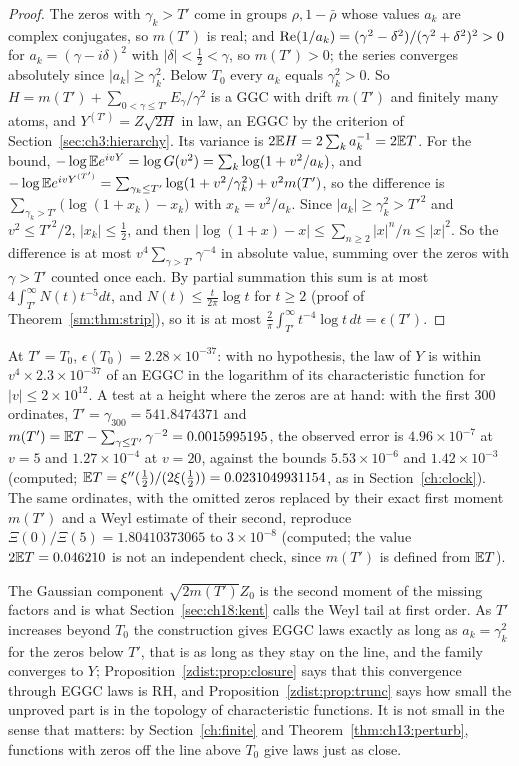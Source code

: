\begin{proof}
The zeros with $\gamma_k>T'$ come in groups $\rho,1-\bar\rho$ whose values $a_k$ are complex conjugates, so $m(T')$ is real; and $\operatorname{Re}(1/a_k)=(\gamma^2-\delta^2)/(\gamma^2+\delta^2)^2>0$ for $a_k=(\gamma-i\delta)^2$ with $|\delta|<\frac12<\gamma$, so $m(T')>0$; the series converges absolutely since $|a_k|\ge\gamma_k^2$. Below $T_0$ every $a_k$ equals $\gamma_k^2>0$. So $H=m(T')+\sum_{0<\gamma\le T'}E_\gamma/\gamma^2$ is a GGC with drift $m(T')$ and finitely many atoms, and $Y^{(T')}=Z\sqrt{2H}$ in law, an EGGC by the criterion of Section~\ref{sec:ch3:hierarchy}. Its variance is $2\mathbb{E} H=2\sum_ka_k^{-1}=2\mathbb{E} T$. For the bound, $-\log\mathbb{E} e^{ivY}=\log G(v^2)=\sum_k\log(1+v^2/a_k)$, and $-\log\mathbb{E} e^{ivY^{(T')}}=\sum_{\gamma_k\le T'}\log(1+v^2/\gamma_k^2)+v^2m(T')$, so the difference is $\sum_{\gamma_k>T'}\big(\log(1+x_k)-x_k\big)$ with $x_k=v^2/a_k$. Since $|a_k|\ge\gamma_k^2>T'^2$ and $v^2\le T'^2/2$, $|x_k|\le\frac12$, and then $|\log(1+x)-x|\le\sum_{n\ge2}|x|^n/n\le|x|^2$. So the difference is at most $v^4\sum_{\gamma>T'}\gamma^{-4}$ in absolute value, summing over the zeros with $\gamma>T'$ counted once each. By partial summation this sum is at most $4\int_{T'}^\infty N(t)t^{-5}dt$, and $N(t)\le\frac t{2\pi}\log t$ for $t\ge2$ (proof of Theorem~\ref{sm:thm:strip}), so it is at most $\frac2\pi\int_{T'}^\infty t^{-4}\log t\,dt=\epsilon(T')$.
\end{proof}

At $T'=T_0$, $\epsilon(T_0)=2.28\times10^{-37}$: with no hypothesis, the law of $Y$ is within $v^4\times2.3\times10^{-37}$ of an EGGC in the logarithm of its characteristic function for $|v|\le2\times10^{12}$. A test at a height where the zeros are at hand: with the first $300$ ordinates, $T'=\gamma_{300}=541.8474371$ and $m(T')=\mathbb{E} T-\sum_{\gamma\le T'}\gamma^{-2}=0.0015995195$, the observed error is $4.96\times10^{-7}$ at $v=5$ and $1.27\times10^{-4}$ at $v=20$, against the bounds $5.53\times10^{-6}$ and $1.42\times10^{-3}$ (computed; $\mathbb{E} T=\xi''(\frac12)/(2\xi(\frac12))=0.0231049931154$, as in Section~\ref{ch:clock}). The same ordinates, with the omitted zeros replaced by their exact first moment $m(T')$ and a Weyl estimate of their second, reproduce $\Xi(0)/\Xi(5)=1.80410373065$ to $3\times10^{-8}$ (computed; the value $2\mathbb{E} T=0.046210$ is not an independent check, since $m(T')$ is defined from $\mathbb{E} T$).

The Gaussian component $\sqrt{2m(T')}Z_0$ is the second moment of the missing factors and is what Section~\ref{sec:ch18:kent} calls the Weyl tail at first order. As $T'$ increases beyond $T_0$ the construction gives EGGC laws exactly as long as $a_k=\gamma_k^2$ for the zeros below $T'$, that is as long as they stay on the line, and the family converges to $Y$; Proposition~\ref{zdist:prop:closure} says that this convergence through EGGC laws is RH, and Proposition~\ref{zdist:prop:trunc} says how small the unproved part is in the topology of characteristic functions. It is not small in the sense that matters: by Section~\ref{ch:finite} and Theorem~\ref{thm:ch13:perturb}, functions with zeros off the line above $T_0$ give laws just as close.

